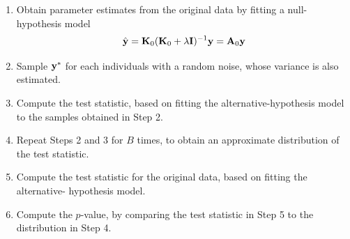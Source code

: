 \documentclass{beamer}
\begin{document}
\begin{frame}  
\begin{enumerate}
\item Obtain parameter estimates from the original data by fitting a null-hypothesis model \[\hat{{\bf y}}={\bf K}_0({\bf K}_0+\lambda {\bf I})^{-1}{\bf y}={\bf A}_0{\bf y}\]
\item Sample ${\bf y}^*$ for each individuals with a random noise, whose variance is also estimated.
\item Compute the test statistic, based on fitting the alternative-hypothesis model to the samples obtained in Step 2.
\item Repeat Steps 2 and 3 for $B$ times, to obtain an approximate distribution of the test statistic.
\item Compute the test statistic for the original data, based on fitting the alternative- hypothesis model.
\item Compute the $p$-value, by comparing the test statistic in Step 5 to the distribution in Step 4.
\end{enumerate}
\end{frame}
\end{document}

